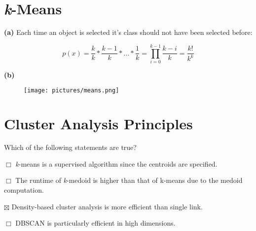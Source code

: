 \setcounter{section}{5}
\section{\emph{k}-Means}

\textbf{(a)} Each time an object is selected it's class should not have been selected before:

$$
p(x) = \frac{k}k * \frac{k-1}k * ... * \frac 1 k = \prod_{i=0}^{k-1} \frac{k-i}k = \frac{k!}{k^k}
$$

\textbf{(b)}
\begin{figure}[H]
\texttt{[image: pictures/means.png]}
\end{figure}

\section{Cluster Analysis Principles}

Which of the following statements are true?

$\Box$ \emph{k}-means is a supervised algorithm since the centroids are specified.

$\Box$ The runtime of \emph{k}-medoid is higher than that of k-means due to the medoid computation.

$\boxtimes$ Density-based cluster analysis is more efficient than single link.

$\Box$ DBSCAN is particularly efficient in high dimensions.


